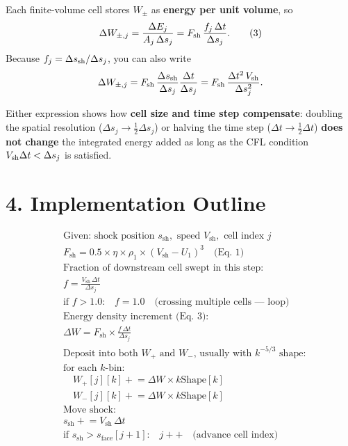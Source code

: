 Each finite-volume cell stores $W_\pm$ as \textbf{energy per unit volume}, so
\[
\Delta W_{\pm,j} = 
\frac{\Delta E_j}{A_j\,\Delta s_j}
= F_{\rm sh}\,\frac{f_j\,\Delta t}{\Delta s_j}.
\tag{3}
\]
Because $f_j = \Delta s_{\rm sh}/\Delta s_j$, you can also write
\[
\Delta W_{\pm,j} = F_{\rm sh}\,\frac{\Delta s_{\rm sh}}{\Delta s_j}
\frac{\Delta t}{\Delta s_j}
= F_{\rm sh}\,\frac{\Delta t^2\,V_{\rm sh}}{\Delta s_j^2}.
\]

Either expression shows how \textbf{cell size and time step compensate}:
doubling the spatial resolution ($\Delta s_j \to \tfrac{1}{2}\Delta s_j$) or halving the time step ($\Delta t \to \tfrac{1}{2}\Delta t$) \textbf{does not change} the integrated energy added as long as the CFL condition $V_{\rm sh} \Delta t < \Delta s_j$ is satisfied.

\section*{4. Implementation Outline}

\[
\begin{aligned}
&\text{Given: shock position } s_{\text{sh}}, \text{ speed } V_{\text{sh}}, \text{ cell index } j \\[0.5em]
&F_{\text{sh}} = 0.5 \times \eta \times \rho_1 \times (V_{\text{sh}} - U_1)^3 \quad \text{(Eq.~1)} \\[1em]
&\text{Fraction of downstream cell swept in this step:} \\
&f = \frac{V_{\text{sh}} \, \Delta t}{\Delta s_j} \\
&\text{if } f > 1.0 \text{:} \quad f = 1.0 \quad \text{(crossing multiple cells --- loop)} \\[1em]
&\text{Energy density increment (Eq.~3):} \\
&\Delta W = F_{\text{sh}} \times \frac{f \, \Delta t}{\Delta s_j} \\[1em]
&\text{Deposit into both } W_{+} \text{ and } W_{-} \text{, usually with } k^{-5/3} \text{ shape:} \\
&\text{for each } k\text{-bin:} \\
&\quad W_{+}[j][k] \mathrel{+}= \Delta W \times k\text{Shape}[k] \\
&\quad W_{-}[j][k] \mathrel{+}= \Delta W \times k\text{Shape}[k] \\[1em]
&\text{Move shock:} \\
&s_{\text{sh}} \mathrel{+}= V_{\text{sh}} \, \Delta t \\
&\text{if } s_{\text{sh}} > s_{\text{face}}[j+1] \text{:} \quad j++ \quad \text{(advance cell index)}
\end{aligned}
\]



